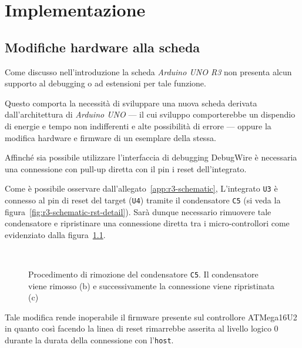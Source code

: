 \chapter{Implementazione}



\section{Modifiche hardware alla scheda}\label{s:dw-board-mod}

Come discusso nell'introduzione la scheda \textit{Arduino UNO R3} non presenta alcun supporto al debugging o ad estensioni per tale funzione.

Questo comporta la necessità di sviluppare una nuova scheda derivata dall'architettura di \textit{Arduino UNO} --- il cui sviluppo comporterebbe un dispendio di energie e tempo non indifferenti e alte possibilità di errore --- oppure la modifica hardware e firmware di un esemplare della stessa.

Affinché sia possibile utilizzare l'interfaccia di debugging DebugWire è necessaria una connessione con pull-up diretta con il pin i reset dell'integrato.

Come è possibile osservare dall'allegato~\ref{app:r3-schematic}, L'integrato \texttt{U3} è connesso al pin di reset del target (\texttt{U4}) tramite il condensatore \texttt{C5} (si veda la figura~\ref{fig:r3-schematic-rst-detail}). Sarà dunque necessario rimuovere tale condensatore e ripristinare una connessione diretta tra i micro-controllori come evidenziato dalla figura~\ref{fig:remove-c5}.

\begin{figure}[t]
    \hfill
    \begin{minipage}{.45\textwidth}
    \end{minipage}
    \begin{minipage}{.45\textwidth}
         \\
    \end{minipage}
    \hfill
    \caption[]{Procedimento di rimozione del condensatore \texttt{C5}. Il condensatore viene rimosso (b) e successivamente la connessione viene ripristinata (c)}\label{fig:remove-c5}
\end{figure}

Tale modifica rende inoperabile il firmware presente sul controllore ATMega16U2 in quanto così facendo la linea di reset rimarrebbe asserita al livello logico 0 durante la durata della connessione con l'\texttt{host}.

